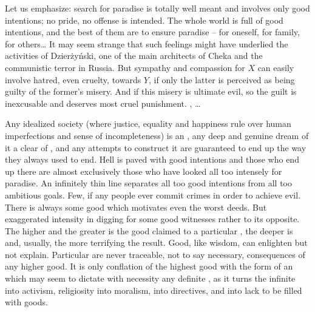 \pa\label{wellmeant} %
Let us emphasize: search for paradise is totally well meant and involves only good
intentions; no pride, no offense is intended.
The whole world is full of good intentions, and the best of them are to
ensure paradise -- for oneself, for family, for others\ldots {}
It may seem strange that such feelings might have underlied the activities of
 Dzier\.{z}y\'{n}ski, one of the main architects of Cheka
and the communistic terror in Russia. But sympathy and compassion for $X$ can
easily involve hatred, even cruelty, towards $Y$, if only the latter is
perceived as being guilty of the former's misery. And if this misery is ultimate
evil, so the guilt is inexcusable and deserves most cruel punishment.
, \ldots

Any idealized society (where justice, equality and happiness rule over human
imperfections and sense of incompleteness) is an , any deep and genuine
dream of it a clear  of , and any attempts to construct
it are guaranteed to end up the way they always used to end.  Hell is paved with
good intentions and those who end up there are almost exclusively those who have
looked all too intensely for paradise. An infinitely thin line separates all too
good intentions from all too ambitious goals.  Few, if any people ever
commit crimes in order to achieve evil. There is always some good which
motivates even the worst deeds. But exaggerated intensity in digging for some 
good witnesses rather to its opposite. The higher and the greater is the good claimed
to  a particular , the deeper is 
and, usually, the more terrifying the result. Good, like wisdom, can enlighten but
not explain. 
Particular  are never  traceable, not to say necessary,
consequences of any higher good. It is only conflation of the highest good with
the  form of an  which may seem to dictate with necessity
any definite , as it turns the infinite  into activism,
religiosity into moralism,  into directives, and  into
lack to be filled with  goods.

